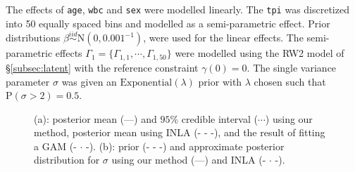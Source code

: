 \documentclass[]{article}
\begin{document}
The effects of \texttt{age}, \texttt{wbc} and \texttt{sex} were modelled linearly. The \texttt{tpi} was discretized into 50 equally spaced bins and modelled as a semi-parametric effect. Prior distributions $\beta \stackrel{iid}{\sim} \text{N}(0, 0.001^{-1})$, were used for the linear effects. The semi-parametric effects $\Gamma_1 = \{\Gamma_{1,1}, \cdots, \Gamma_{1,50}\}$ were modelled using the RW2 model of \S\ref{subsec:latent} with the reference constraint $\gamma(0) = 0$. The single variance parameter $\sigma$ was given an $\text{Exponential}(\lambda)$ prior with $\lambda$ chosen such that $\text{P}(\sigma > 2) = 0.5$. 

\begin{figure}[ht]
\centering
{}
\caption{(a): posterior mean (---) and $95\%$ credible interval ($\cdots$) using our method, posterior mean using INLA (- - -), and the result of fitting a GAM (- $\cdot$ -). (b): prior (- - -) and approximate posterior distribution for $\sigma$ using our method (---) and INLA (- $\cdot$ -).}
\label{fig:leuk}
\end{figure}
\end{document}
